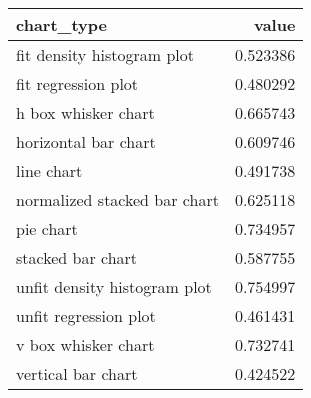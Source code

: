 \begin{tabular}{lr}
\toprule
                  chart\_type &    value \\
\midrule
  fit density histogram plot & 0.523386 \\
         fit regression plot & 0.480292 \\
         h box whisker chart & 0.665743 \\
        horizontal bar chart & 0.609746 \\
                  line chart & 0.491738 \\
normalized stacked bar chart & 0.625118 \\
                   pie chart & 0.734957 \\
           stacked bar chart & 0.587755 \\
unfit density histogram plot & 0.754997 \\
       unfit regression plot & 0.461431 \\
         v box whisker chart & 0.732741 \\
          vertical bar chart & 0.424522 \\
\bottomrule
\end{tabular}
